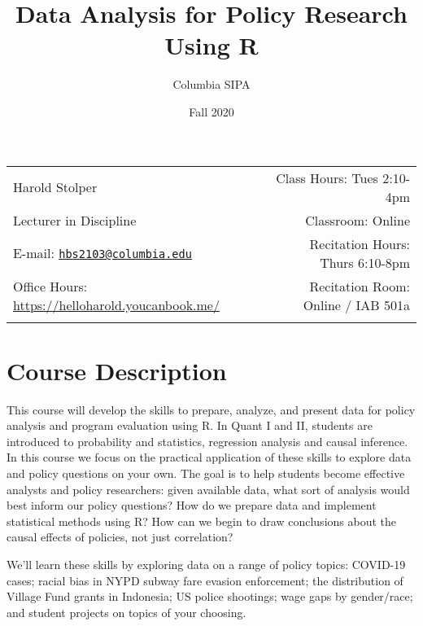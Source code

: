\documentclass[11pt,]{article}
\title{Data Analysis for Policy Research Using R}
\author{Columbia \textbar{} SIPA}
\date{Fall 2020}
\begin{document}
  

		\maketitle
		
	
		\thispagestyle{firststyle}



	\noindent \begin{tabular*}{\textwidth}{ @{\extracolsep{\fill}} lr @{\extracolsep{\fill}}}

Harold Stolper & Class Hours: Tues 2:10-4pm\\
Lecturer in Discipline & Classroom: Online\\
E-mail: \texttt{\href{mailto:hbs2103@columbia.edu}{\nolinkurl{hbs2103@columbia.edu}}} & Recitation Hours: Thurs
6:10-8pm\\
Office Hours: \url{https://helloharold.youcanbook.me/}  &  Recitation Room: Online
/ IAB 501a\\
	&  \\
	\hline
	\end{tabular*}
	
\vspace{2mm}
	


\hypertarget{course-description}{%
\section{Course Description}\label{course-description}}

This course will develop the skills to prepare, analyze, and present
data for policy analysis and program evaluation using R. In Quant I and
II, students are introduced to probability and statistics, regression
analysis and causal inference. In this course we focus on the practical
application of these skills to explore data and policy questions on your
own. The goal is to help students become effective analysts and policy
researchers: given available data, what sort of analysis would best
inform our policy questions? How do we prepare data and implement
statistical methods using R? How can we begin to draw conclusions about
the causal effects of policies, not just correlation?

We'll learn these skills by exploring data on a range of policy topics:
COVID-19 cases; racial bias in NYPD subway fare evasion enforcement; the
distribution of Village Fund grants in Indonesia; US police shootings;
wage gaps by gender/race; and student projects on topics of your
choosing.
\end{document}
